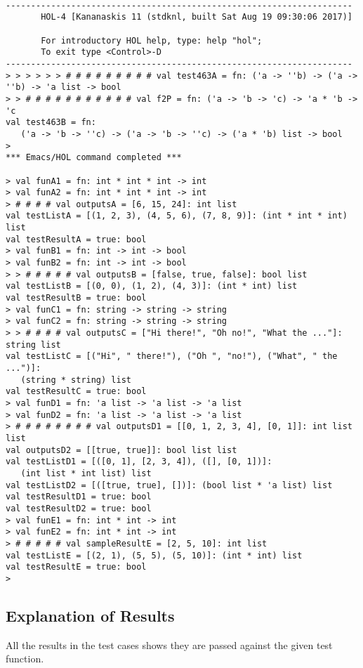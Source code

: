 \documentclass{report}
\begin{document}
\setcounter{sessioncount}{0}
\begin{session}
  \begin{scriptsize}
\begin{verbatim}

---------------------------------------------------------------------
       HOL-4 [Kananaskis 11 (stdknl, built Sat Aug 19 09:30:06 2017)]

       For introductory HOL help, type: help "hol";
       To exit type <Control>-D
---------------------------------------------------------------------
> > > > > > # # # # # # # # # val test463A = fn: ('a -> ''b) -> ('a -> ''b) -> 'a list -> bool
> > # # # # # # # # # # # val f2P = fn: ('a -> 'b -> 'c) -> 'a * 'b -> 'c
val test463B = fn:
   ('a -> 'b -> ''c) -> ('a -> 'b -> ''c) -> ('a * 'b) list -> bool
> 
*** Emacs/HOL command completed ***

> val funA1 = fn: int * int * int -> int
> val funA2 = fn: int * int * int -> int
> # # # # val outputsA = [6, 15, 24]: int list
val testListA = [(1, 2, 3), (4, 5, 6), (7, 8, 9)]: (int * int * int) list
val testResultA = true: bool
> val funB1 = fn: int -> int -> bool
> val funB2 = fn: int -> int -> bool
> > # # # # # val outputsB = [false, true, false]: bool list
val testListB = [(0, 0), (1, 2), (4, 3)]: (int * int) list
val testResultB = true: bool
> val funC1 = fn: string -> string -> string
> val funC2 = fn: string -> string -> string
> > # # # # val outputsC = ["Hi there!", "Oh no!", "What the ..."]: string list
val testListC = [("Hi", " there!"), ("Oh ", "no!"), ("What", " the ...")]:
   (string * string) list
val testResultC = true: bool
> val funD1 = fn: 'a list -> 'a list -> 'a list
> val funD2 = fn: 'a list -> 'a list -> 'a list
> # # # # # # # # val outputsD1 = [[0, 1, 2, 3, 4], [0, 1]]: int list list
val outputsD2 = [[true, true]]: bool list list
val testListD1 = [([0, 1], [2, 3, 4]), ([], [0, 1])]:
   (int list * int list) list
val testListD2 = [([true, true], [])]: (bool list * 'a list) list
val testResultD1 = true: bool
val testResultD2 = true: bool
> val funE1 = fn: int * int -> int
> val funE2 = fn: int * int -> int
> # # # # # val sampleResultE = [2, 5, 10]: int list
val testListE = [(2, 1), (5, 5), (5, 10)]: (int * int) list
val testResultE = true: bool
> 

\end{verbatim}
  \end{scriptsize}
\end{session}

\subsection{Explanation of Results}
\label{sec:explanation-results}
All the results in the test cases shows they are passed against the given test function.
\end{document}
